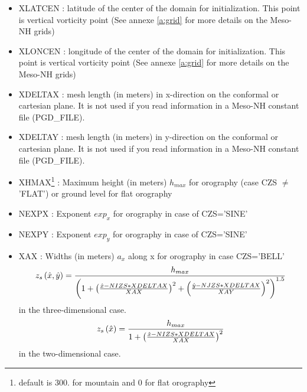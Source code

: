 \begin{itemize}          
\item XLATCEN  : latitude  of the center of the domain for initialization. This  point is vertical vorticity point (See annexe \ref{a:grid} for more details on the Meso-NH grids)

\item XLONCEN  :  longitude of the center of the domain for initialization. This  point is vertical vorticity point (See annexe \ref{a:grid} for more details on the Meso-NH grids)

\item XDELTAX  : mesh length (in meters)
 in x-direction on the conformal or cartesian plane. It is  not
used if you read information in a Meso-NH constant file (PGD\_FILE). 

\item XDELTAY  : mesh length (in meters)
 in y-direction on the conformal or cartesian plane. It is  not
used if you read information in a Meso-NH constant file (PGD\_FILE).

\item  XHMAX\footnote{default is 300. for mountain and 0 for flat orography}  
: Maximum height (in meters)
 $h_{max}$ for orography (case CZS $\neq$ 'FLAT') or ground level for
flat orography

\item   NEXPX  : Exponent $exp_{x}$ for 
 orography in case of CZS='SINE'

\item   NEXPY   : Exponent $exp_{y}$ 
for  orography in case of CZS='SINE'

\item   XAX  :  Widths (in meters)
 $a_{x}$ along x 
 for orography in case CZS='BELL'
$$ z_s \left( \hat{x} , \hat{y} \right) = { h_{max} \over  \left(
  1 +
 \left(  { \hat{x} - NIZS * XDELTAX \over XAX } \right) ^2 + 
 \left(  { \hat{y} - NJZS * XDELTAX \over XAY } \right) ^2 
                                                      \right) ^{1.5 } } $$ 
in the three-dimensional case.
$$ z_s \left( \hat{x}  \right) = {  h_{max} \over  
1 + \left(  { \hat{x} - NIZS * XDELTAX \over XAX } \right) ^2 } $$
in the two-dimensional case.


\end{itemize}
